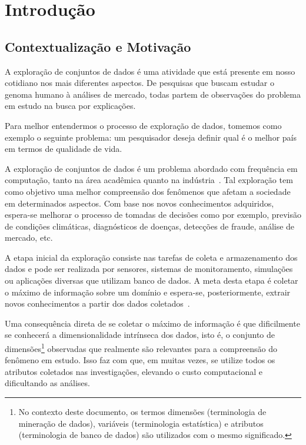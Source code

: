 \chapter{Introdução}

\section{Contextualização e Motivação}

A exploração de conjuntos de dados é uma atividade que está presente em nosso cotidiano nos mais diferentes aspectos. De pesquisas que buscam estudar o genoma humano à análises de mercado, todas partem de observações do problema em estudo na busca por explicações.

Para melhor entendermos o processo de exploração de dados, tomemos como exemplo o seguinte problema: um pesquisador deseja definir qual é o melhor país em termos de qualidade de vida.

A exploração de conjuntos de dados é um problema abordado com frequência em computação, tanto na área acadêmica quanto na indústria~\cite{Ngai2009,Harding2006}. Tal exploração tem como objetivo uma melhor compreensão dos fenômenos que afetam a sociedade em determinados aspectos. Com base nos novos conhecimentos adquiridos, espera-se melhorar o processo de tomadas de decisões como por exemplo, previsão de condições climáticas, diagnósticos de doenças, detecções de fraude, análise de mercado, etc.

A etapa inicial da exploração consiste nas tarefas de coleta e armazenamento dos dados e pode ser realizada por sensores, sistemas de monitoramento, simulações ou aplicações diversas que utilizam banco de dados. A meta desta etapa é coletar o máximo de informação sobre um domínio e espera-se, posteriormente, extrair novos conhecimentos a partir dos dados coletados~\cite{Keim2002}. 

Uma consequência direta de se coletar o máximo de informação é que dificilmente se conhecerá a dimensionalidade intrínseca dos dados, isto é, o conjunto de dimensões\footnote{No contexto deste documento, os termos dimensões (terminologia de mineração de dados), variáveis (terminologia estatística) e atributos (terminologia de banco de dados) são utilizados com o mesmo significado.} observadas que realmente são relevantes para a compreensão do fenômeno em estudo. Isso faz com que, em muitas vezes, se utilize todos os atributos coletados nas investigações, elevando o custo computacional e dificultando as análises. 

